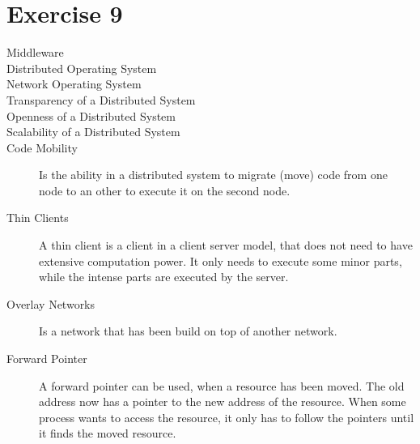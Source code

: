 \documentclass{article}
\begin{document}
	\section*{Exercise 9}
	\begin{description}
		\item[Middleware]

		\item[Distributed Operating System]

		\item[Network Operating System]

		\item[Transparency of a Distributed System]

		\item[Openness of a Distributed System]

		\item[Scalability of a Distributed System]

		\item[Code Mobility] Is the ability in a distributed system to migrate (move) code from one node to an other to execute it on the second node. 
		
		\item[Thin Clients] A thin client is a client in a client server model, that does not need to have extensive computation power. It only needs to execute some minor parts, while the intense parts are executed by the server. 

		\item[Overlay Networks] Is a network that has been build on top of another network. 
		
		\item[Forward Pointer] A forward pointer can be used, when a resource has been moved. The old address now has a pointer to the new address of the resource. When some process wants to access the resource, it only has to follow the pointers until it finds the moved resource. 

	\end{description}
\end{document}
